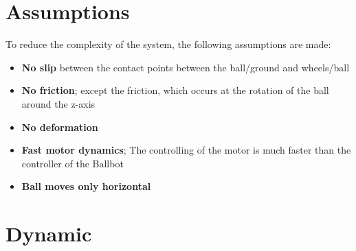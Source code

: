\documentclass[twoside,colorback,accentcolor=tud4c,11pt]{tudreport}
\begin{document}
	\section{Assumptions}
	
	To reduce the complexity of the system, the following assumptions are made: 
	
	\begin{itemize}
		\item \textbf{No slip} between the contact points between the ball/ground and wheels/ball
		\item \textbf{No friction}; except the friction, which occurs at the rotation of the ball around the z-axis
		\item \textbf{No deformation}
		\item \textbf{Fast motor dynamics}; The controlling of the motor is much faster than the controller of the Ballbot
		\item \textbf{Ball moves only horizontal}
	\end{itemize}
	
	\section{Dynamic}
	
	
	
	
\end{document}
